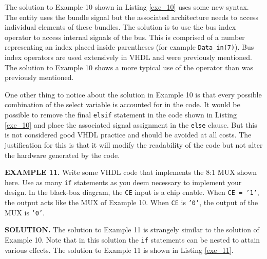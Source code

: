 The solution to Example 10 shown in Listing \ref{exe_10} uses some new syntax. The entity uses the bundle signal but the associated architecture needs to access individual elements of these bundles. The solution is to use the bus index operator to access internal signals of the bus. This is comprised of a number representing an index placed inside parentheses (for example \texttt{Data\_in(7)}). Bus index operators are used extensively in VHDL and were previously mentioned. The solution to Example 10 shows a more typical use of the operator than was previously mentioned.

One other thing to notice about the solution in Example 10 is that every possible combination of the select variable is accounted for in the code. It would be possible to remove the final \texttt{elsif} statement in the code shown in Listing \ref{exe_10} and place the associated signal assignment in the \texttt{else} clause. But this is not considered good VHDL practice and should be avoided at all costs. The justification for this is that it will modify the readability of the code but not alter the hardware generated by the code.

\begin{leftbar}
\noindent
\begin{minipage}{0.52\linewidth}
\textbf{EXAMPLE 11.}
Write some VHDL code that implements the 8:1 MUX shown here. Use as many \texttt{if} statements as you deem necessary to implement your design. In the black-box diagram, the  \texttt{CE} input is a chip enable. When \texttt{CE = '1'}, the output acts like the  MUX of Example 10. When  \texttt{CE} is  \texttt{'0'}, the output of the MUX is  \texttt{'0'}.
\end{minipage}
\begin{minipage}{0.45\linewidth}
\begin{flushright}
\end{flushright}
\end{minipage}
\end{leftbar}
\noindent
\textbf{SOLUTION.} The solution to Example 11 is strangely similar to the solution of Example 10. Note that in this solution the \texttt{if} statements can be nested to attain various effects. The solution to Example 11 is shown in Listing \ref{exe_11}.

